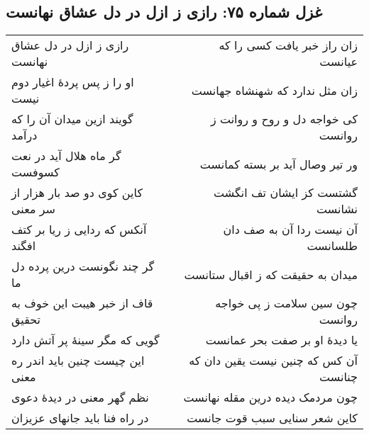 \begin{center}
\section*{غزل شماره ۷۵: رازی ز ازل در دل عشاق نهانست}
\label{sec:075}
\begin{longtable}{l p{0.5cm} r}
رازی ز ازل در دل عشاق نهانست
&&
زان راز خبر یافت کسی را که عیانست
\\
او را ز پس پردهٔ اغیار دوم نیست
&&
زان مثل ندارد که شهنشاه جهانست
\\
گویند ازین میدان آن را که درآمد
&&
کی خواجه دل و روح و روانت ز روانست
\\
گر ماه هلال آید در نعت کسوفست
&&
ور تیر وصال آید بر بسته کمانست
\\
کاین کوی دو صد بار هزار از سر معنی
&&
گشتست کز ایشان تف انگشت نشانست
\\
آنکس که ردایی ز ریا بر کتف افگند
&&
آن نیست ردا آن به صف دان طلسانست
\\
گر چند نگونست درین پرده دل ما
&&
میدان به حقیقت که ز اقبال ستانست
\\
قاف از خبر هیبت این خوف به تحقیق
&&
چون سین سلامت ز پی خواجه روانست
\\
گویی که مگر سینهٔ پر آتش دارد
&&
یا دیدهٔ او بر صفت بحر عمانست
\\
این چیست چنین باید اندر ره معنی
&&
آن کس که چنین نیست یقین دان که چنانست
\\
نظم گهر معنی در دیدهٔ دعوی
&&
چون مردمک دیده درین مقله نهانست
\\
در راه فنا باید جانهای عزیزان
&&
کاین شعر سنایی سبب قوت جانست
\\
\end{longtable}
\end{center}
